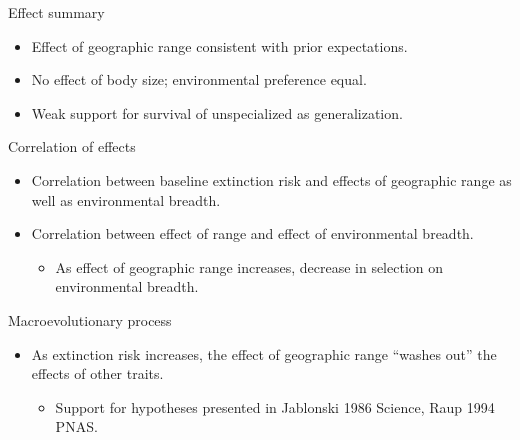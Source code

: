 \documentclass{beamer}
\begin{document}
\begin{frame}
  \begin{block}{Effect summary}
    \begin{itemize}
      \item Effect of geographic range consistent with prior expectations.
      \item No effect of body size; environmental preference equal.
      \item Weak support for survival of unspecialized as generalization.
    \end{itemize}
  \end{block}
\end{frame}

\begin{frame}
  \begin{block}{Correlation of effects}
    \begin{itemize}
      \item Correlation between baseline extinction risk and effects of geographic range as well as environmental breadth.
      \item Correlation between effect of range and effect of environmental breadth.
        \begin{itemize}
          \item As effect of geographic range increases, decrease in selection on environmental breadth.
        \end{itemize}
    \end{itemize}
  \end{block}
\end{frame}

\begin{frame}
  \begin{alertblock}{Macroevolutionary process}
    \begin{itemize}
      \item As extinction risk increases, the effect of geographic range ``washes out'' the effects of other traits.
        \begin{itemize}
          \item Support for hypotheses presented in Jablonski 1986 Science, Raup 1994 PNAS.
        \end{itemize}
    \end{itemize}
  \end{alertblock}
\end{frame}
\end{document}
